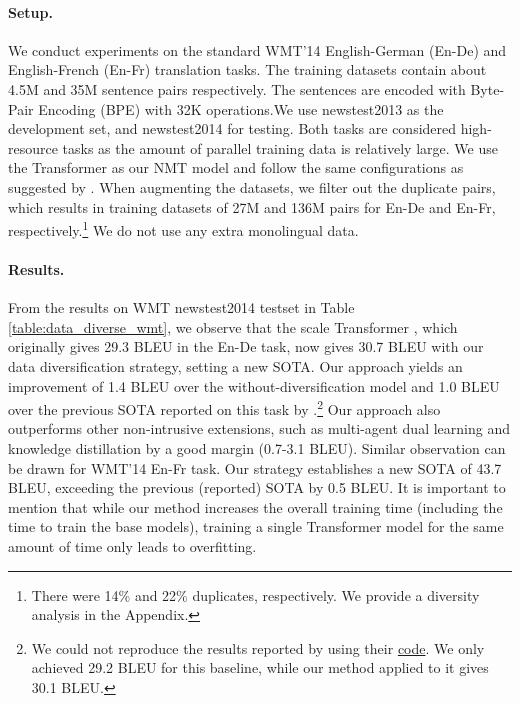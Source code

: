 \documentclass{article}
\begin{document}
\paragraph{Setup.} {We conduct experiments on the standard WMT'14 English-German (En-De) and English-French (En-Fr) translation tasks. The training datasets contain about 4.5M and 35M sentence pairs respectively. 
{The sentences are encoded with Byte-Pair Encoding (BPE) \citep{sennrich2015neural} with 32K operations.}We use newstest2013 as the development set, and newstest2014 for testing. {Both tasks are considered high-resource tasks as the amount of parallel training data is relatively large.} 
We use the Transformer \citep{vaswani2017attention} as our NMT model and follow the same configurations as suggested by \citet{scaling_nmt_ott2018scaling}.
When augmenting the datasets, we filter out the duplicate pairs, which results in training datasets of 27M and 136M pairs for En-De and En-Fr, respectively.\footnote{There were 14\% and 22\% duplicates, respectively. 
We provide a diversity analysis in the Appendix.} We do {not} use any extra monolingual data. 
}









\vspace{-0.5em}
\paragraph{Results.} From the results on WMT newstest2014 testset in Table \ref{table:data_diverse_wmt}, we observe that the scale Transformer \citep{scaling_nmt_ott2018scaling}, which originally gives 29.3 BLEU in the En-De task, now gives 30.7 BLEU with our data diversification  strategy, setting a new SOTA. Our approach yields an improvement of 1.4 BLEU over the without-diversification model and 1.0 BLEU over the previous SOTA reported on this task by \citet{payless_wu2018}.\footnote{We could not {reproduce} the results reported by \citet{payless_wu2018} using their \href{https://github.com/pytorch/fairseq/tree/master/examples/pay_less_attention_paper\#wmt16-en-de}{code}. We only achieved 29.2 BLEU for this baseline, while our method applied to it gives 30.1 BLEU.} Our approach also outperforms other non-intrusive extensions, such as multi-agent dual learning and knowledge distillation by a good margin (0.7-3.1 BLEU).
Similar observation can be drawn for WMT'14 En-Fr task. Our strategy establishes a new SOTA of 43.7 BLEU, exceeding the previous (reported) SOTA by 0.5 BLEU. It is important to mention that while our method increases the overall training time (including the time to train the base models), training a single Transformer model for the same amount of time only leads to overfitting.
\end{document}
